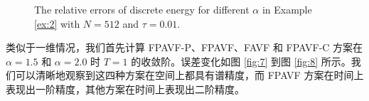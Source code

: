 	\begin{figure}[H]
	\begin{center}
	  \caption{The relative errors of discrete energy for different $\alpha$ in Example \ref{ex:2} with $N = 512$ and $\tau=0.01$.} \label{fig:6}
	\end{center}
	\end{figure}

	类似于一维情况，我们首先计算 FPAVF-P、FPAVF、FAVF 和 FPAVF-C 方案在 $\alpha=1.5$ 和 $\alpha=2.0$ 时 $T=1$ 的收敛阶。误差变化如图 \ref{fig:7} 到图 \ref{fig:8} 所示。我们可以清晰地观察到这四种方案在空间上都具有谱精度，而 FPAVF 方案在时间上表现出一阶精度，其他方案在时间上表现出二阶精度。

